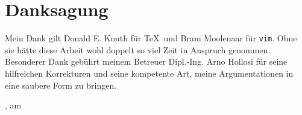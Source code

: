 
\chapter*{Danksagung}

Mein Dank gilt Donald E. Knuth für \TeX\ und Bram Moolenaar für \texttt{vim}. Ohne sie hätte diese Arbeit wohl doppelt so viel Zeit in Anspruch genommen.
Besonderer Dank gebührt meinem Betreuer Dipl.-Ing. Arno Hollosi für seine hilfreichen Korrekturen und seine kompetente Art, meine Argumentationen in eine
saubere Form zu bringen.

\vspace{1.5cm}

\begin{center}
\raggedleft{\campusAuthor}
\end{center}

\vspace{1.5cm}

\campusCity, am \campusDate

